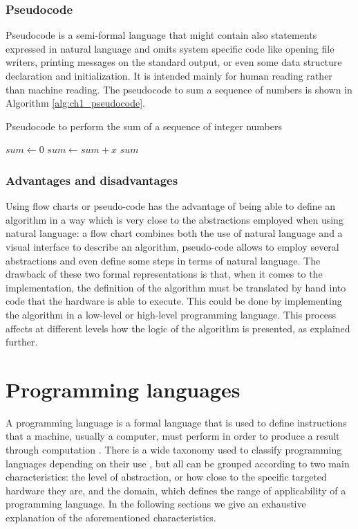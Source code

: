 \subsubsection*{Pseudocode}
Pseudocode is a semi-formal language that might contain also statements expressed in natural language and omits system specific code like opening file writers, printing messages on the standard output, or even some data structure declaration and initialization. It is intended mainly for human reading rather than machine reading. The pseudocode to sum a sequence of numbers is shown in Algorithm \ref{alg:ch1_pseudocode}.

\begin{algorithm}
	\caption{Pseudocode to perform the sum of a sequence of integer numbers}
	\label{alg:ch1_pseudocode}
	\begin{algorithmic}
			\State $sum \gets 0$
				\State $sum \gets sum + x$
			\EndFor
			\State \Return $sum$
		\EndFunction
	\end{algorithmic}
\end{algorithm}

\subsubsection*{Advantages and disadvantages}
Using flow charts or pseudo-code has the advantage of being able to define an algorithm in a way which is very close to the abstractions employed when using natural language: a flow chart combines both the use of natural language and a visual interface to describe an algorithm, pseudo-code allows to employ several abstractions and even define some steps in terms of natural language. The drawback of these two formal representations is that, when it comes to the implementation, the definition of the algorithm must be translated by hand into code that the hardware is able to execute. This could be done by implementing the algorithm in a low-level or high-level programming language. This process affects at different levels how the logic of the algorithm is presented, as explained further.

\section{Programming languages}
\label{sec:ch1_programming_languages}
A programming language is a formal language that is used to define instructions that a machine, usually a computer, must perform in order to produce a result through computation \cite{oxford2008, mordechai1996, narasimhan1967programming}. There is a wide taxonomy used to classify programming languages depending on their use \cite{kelleher2005lowering, myers1986visual, myers1990taxonomies}, but all can be grouped according to two main characteristics: the level of abstraction, or how close to the specific targeted hardware they are, and the domain, which defines the range of applicability of a programming language. In the following sections we give an exhaustive explanation of the aforementioned characteristics.

